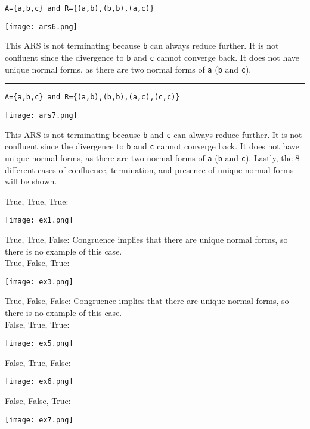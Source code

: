 \documentclass{article}
\theoremstyle{theorem}
\theoremstyle{definition}
\theoremstyle{remark}
\begin{document}
\noindent \texttt{A=\{a,b,c\} and R=\{(a,b),(b,b),(a,c)\}}
\begin{center}
    \texttt{[image: ars6.png]}
\end{center}
This ARS is not terminating because \texttt{b} can always reduce further. It is not confluent since the divergence to \texttt{b} and \texttt{c} cannot converge back. It does not have unique normal forms, as there are two normal forms of \texttt{a} (\texttt{b} and \texttt{c}).

\noindent\rule{\textwidth}{1pt}

\noindent \texttt{A=\{a,b,c\} and R=\{(a,b),(b,b),(a,c),(c,c)\}}
\begin{center}
    \texttt{[image: ars7.png]}
\end{center}
This ARS is not terminating because \texttt{b} and \texttt{c} can always reduce further. It is not confluent since the divergence to \texttt{b} and \texttt{c} cannot converge back. It does not have unique normal forms, as there are two normal forms of \texttt{a} (\texttt{b} and \texttt{c}).
\newpage
Lastly, the 8 different cases of confluence, termination, and presence of unique normal forms will be shown.

True, True, True:
\begin{center}
    \texttt{[image: ex1.png]}
\end{center}

True, True, False: Congruence implies that there are unique normal forms, so there is no example of this case.\\

True, False, True:
\begin{center}
    \texttt{[image: ex3.png]}
\end{center}

True, False, False: Congruence implies that there are unique normal forms, so there is no example of this case.\\

False, True, True:
\begin{center}
    \texttt{[image: ex5.png]}
\end{center}

False, True, False:
\begin{center}
    \texttt{[image: ex6.png]}
\end{center}

False, False, True:
\begin{center}
    \texttt{[image: ex7.png]}
\end{center}
\end{document}

